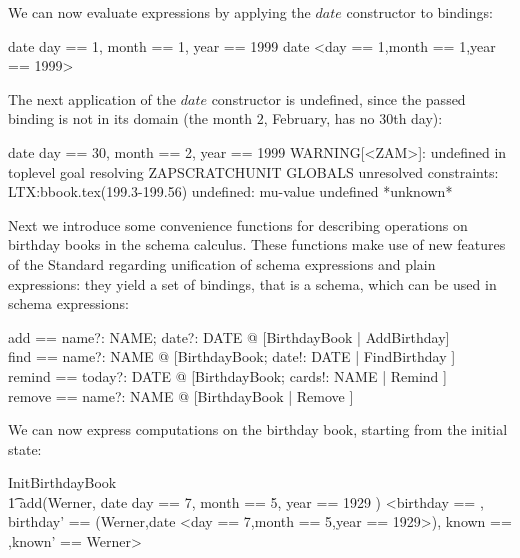 \documentclass{article}
\begin{document}
We can now evaluate expressions by applying the $date$ constructor
to bindings:

\begin{zexecexpr}
  date \lbind day == 1, month == 1, year == 1999 \rbind   
\yields
date <day == 1,month == 1,year == 1999>
\end{zexecexpr}

The next application of the $date$ constructor is undefined,
since the passed binding is not in its domain (the month $2$,
February, has no $30$th day):

\begin{zexecexpr}
  date \lbind day == 30, month == 2, year == 1999 \rbind 
\yields
WARNING[<ZAM>]: 
  undefined in toplevel goal {
    resolving ZAPSCRATCHUNIT GLOBALS
    unresolved constraints:
     LTX:bbook.tex(199.3-199.56) undefined: 
      mu-value undefined
  }
*unknown*
\end{zexecexpr}

Next we introduce some convenience functions for describing operations
on birthday books in the schema calculus.  These functions make use of
new features of the Standard regarding unification of schema
expressions and plain expressions: they yield a set of bindings, that
is a schema, which can be used in schema expressions:

\begin{axdef}
  add == 
   \lambda name?: NAME;  date?:  DATE @ [\Delta BirthdayBook | AddBirthday] \\
  find == 
    \lambda name?: NAME @ [\Delta BirthdayBook; date!: DATE | FindBirthday ] \\
  remind == 
    \lambda today?: DATE @ 
      [\Delta BirthdayBook; cards!: \power NAME  | Remind ] \\
  remove == 
    \lambda name?: NAME @ [\Delta BirthdayBook | Remove ]
\end{axdef}

We can now express computations on the birthday book, starting
from the initial state:

\begin{zexecexpr}
  InitBirthdayBook \\\t1
  \semi add(Werner, date \lbind   day == 7, month == 5, year == 1929 \rbind)
\yields
{<birthday == {},
  birthday' == {(Werner,date <day == 7,month == 5,year == 1929>)},
  known == {},known' == {Werner}>}
\end{zexecexpr}
\end{document}
